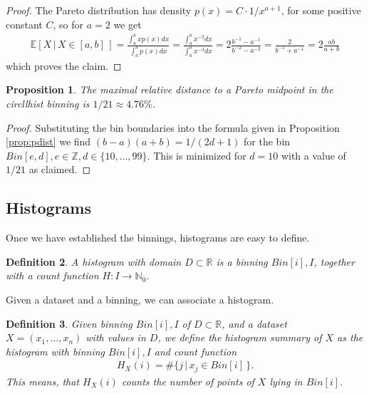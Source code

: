 \documentclass{article}
\theoremstyle{plain}
\newtheorem{definition}{Definition}[section]
\newtheorem{proposition}[definition]{Proposition}
\theoremstyle{remark}
\newcommand{\IE}{\mathbb{E}}
\newcommand{\IN}{\mathbb{N}}
\newcommand{\IR}{\mathbb{R}}
\newcommand{\IZ}{\mathbb{Z}}
\newcommand{\ra}{\rightarrow}
\begin{document}
\begin{proof}
  The Pareto distribution has density $p(x) =C \cdot 1/x^{a+1}$, for some positive constant $C$, so for $a=2$ we get
  \begin{align*}
    \IE[ X \, | \, X \in [a,b] \,] = \frac{\int_a^b x p(x) dx}{\int_a^b p(x) dx}
    = \frac{\int_a^b x^{-2}  dx}{\int_a^b x^{-3} dx} = 2 \frac{b^{-1} - a^{-1}}{b^{-2}- a^{-2}}
    = \frac{2}{b^{-1} + a^{-1}}
    = 2 \frac{ab}{a + b}
  \end{align*}
  which proves the claim.
\end{proof}

\begin{proposition}\label{prop:21}
  The maximal relative distance to a Pareto midpoint in the circllhist binning is $1/21 \approx 4.76\%$.
\end{proposition}

\begin{proof}
  Substituting the bin boundaries into the formula given in Proposition \ref{prop:pdist} we find
  $(b - a)(a + b) = 1/(2d + 1)$ for the bin $Bin[e,d], e \in \IZ, d \in \{ 10, \dots, 99 \}$.
  This is minimized for $d = 10$ with a value of $1/21$ as claimed.
\end{proof}

\subsection{Histograms}

Once we have established the binnings, histograms are easy to define.

\begin{definition}\label{def:hist}
  A histogram with domain $D \subset \IR$ is a binning $Bin[i],I$, together with a count function $H: I \ra \IN_{0}$.
\end{definition}

Given a dataset and a binning, we can associate a histogram.

\begin{definition}
  Given binning $Bin[i],I$ of $D \subset \IR$, and a dataset $X = (x_1,\dots,x_n)$ with values in
  $D$, we define the histogram summary of $X$ as the histogram with binning $Bin[i],I$ and count
  function
  \begin{align*}
    H_X(i) = \# \{ j \, | \, x_j \in Bin[i] \, \}.
  \end{align*}
  This means, that $H_X(i)$ counts the number of points of $X$ lying in $Bin[i]$.
\end{definition}
\end{document}
